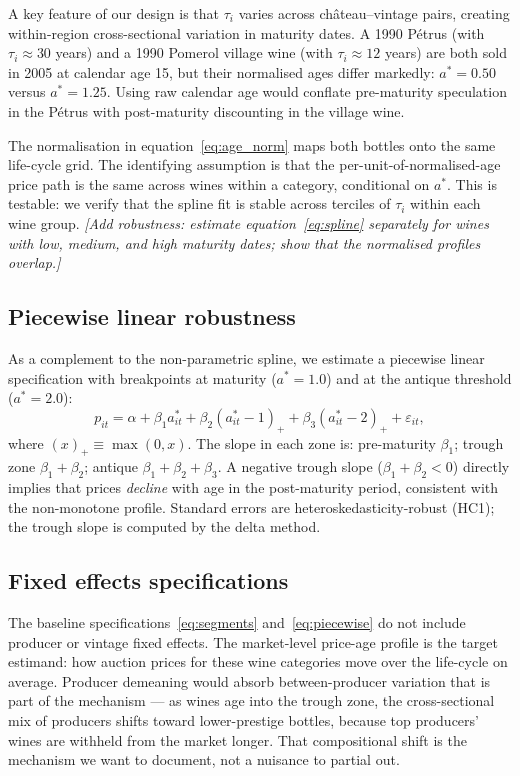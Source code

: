 A key feature of our design is that $\tau_i$ varies across château--vintage pairs,
creating within-region cross-sectional variation in maturity dates. A 1990 Pétrus (with
$\tau_i \approx 30$ years) and a 1990 Pomerol village wine (with $\tau_i \approx 12$ years)
are both sold in 2005 at calendar age 15, but their normalised ages differ markedly:
$a^* = 0.50$ versus $a^* = 1.25$. Using raw calendar age would conflate pre-maturity
speculation in the Pétrus with post-maturity discounting in the village wine.

The normalisation in equation~\eqref{eq:age_norm} maps both bottles onto the same
life-cycle grid. The identifying assumption is that the per-unit-of-normalised-age
price path is the same across wines within a category, conditional on $a^*$. This is
testable: we verify that the spline fit is stable across terciles of $\tau_i$ within
each wine group. \textit{[Add robustness: estimate equation~\eqref{eq:spline} separately for
wines with low, medium, and high maturity dates; show that the normalised profiles overlap.]}

\subsection{Piecewise linear robustness}
\label{sec:empirics:piecewise}

As a complement to the non-parametric spline, we estimate a piecewise linear specification
with breakpoints at maturity ($a^* = 1.0$) and at the antique threshold ($a^* = 2.0$):
\begin{equation}
  p_{it} = \alpha + \beta_1 a_{it}^* + \beta_2 (a_{it}^* - 1)_+ + \beta_3 (a_{it}^* - 2)_+
           + \varepsilon_{it},
  \label{eq:piecewise}
\end{equation}
where $(x)_+ \equiv \max(0,x)$. The slope in each zone is:
pre-maturity $\beta_1$; trough zone $\beta_1 + \beta_2$; antique $\beta_1 + \beta_2 + \beta_3$.
A negative trough slope ($\beta_1 + \beta_2 < 0$) directly implies that prices \emph{decline}
with age in the post-maturity period, consistent with the non-monotone profile.
Standard errors are heteroskedasticity-robust (HC1); the trough slope is computed by the
delta method.

\subsection{Fixed effects specifications}
\label{sec:empirics:fe}

The baseline specifications~\eqref{eq:segments} and~\eqref{eq:piecewise} do not include
producer or vintage fixed effects. The market-level price-age profile is the target estimand:
how auction prices for these wine categories move over the life-cycle on average. Producer
demeaning would absorb between-producer variation that is part of the mechanism — as wines age
into the trough zone, the cross-sectional mix of producers shifts toward lower-prestige bottles,
because top producers' wines are withheld from the market longer. That compositional shift is
the mechanism we want to document, not a nuisance to partial out.

